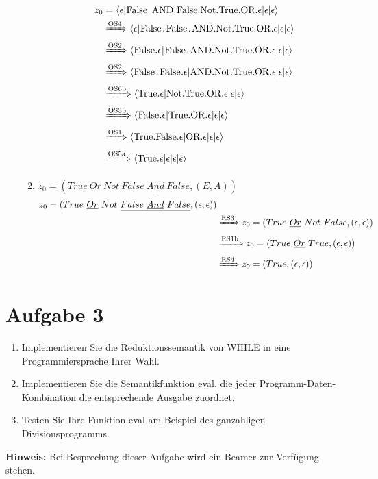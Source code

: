 \documentclass[ngerman,a4paper]{report}
\begin{document}
\begin{enumerate}
\begin{enumerate}
\begin{align*}
z_0&=\langle \epsilon|\text{\lstinline!False AND False.Not.True.OR!}.\epsilon|\epsilon|\epsilon\rangle \\
&\xRightarrow{\text{OS4}} \langle \epsilon|\text{\lstinline!False.False.AND.Not.True.OR!}.\epsilon|\epsilon|\epsilon\rangle\\
&\xRightarrow{\text{OS2}} \langle \text{\lstinline!False!}.\epsilon|\text{\lstinline!False.AND.Not.True.OR!}.\epsilon|\epsilon|\epsilon\rangle\\
&\xRightarrow{\text{OS2}} \langle \text{\lstinline!False.False!}.\epsilon|\text{\lstinline!AND.Not.True.OR!}.\epsilon|\epsilon|\epsilon\rangle\\
&\xRightarrow{\text{OS6b}} \langle \text{\lstinline!True!}.\epsilon|\text{\lstinline!Not.True.OR!}.\epsilon|\epsilon|\epsilon\rangle\\
&\xRightarrow{\text{OS3b}} \langle \text{\lstinline!False!}.\epsilon|\text{\lstinline!True.OR!}.\epsilon|\epsilon|\epsilon\rangle\\
&\xRightarrow{\text{OS1}} \langle \text{\lstinline!True.False!}.\epsilon|\text{\lstinline!OR!}.\epsilon|\epsilon|\epsilon\rangle\\
&\xRightarrow{\text{OS5a}} \langle \text{\lstinline!True!}.\epsilon|\epsilon|\epsilon|\epsilon\rangle\\
\end{align*}
\item $z_0=(True\ \underline{Or}\ Not\ \underline{False\ \underline{And}\ False}, (E,A))$\\
\begin{align*}
z_0=(True\ \underline{Or}\ Not\ \underline{False\ \underline{And}\ False}, (\epsilon,\epsilon))\\
&\xRightarrow{\text{RS3}} z_0=(True\ \underline{Or}\ Not\ False, (\epsilon,\epsilon))\\
&\xRightarrow{\text{RS1b}} z_0=(True\ \underline{Or}\ True, (\epsilon,\epsilon))\\
&\xRightarrow{\text{RS4}} z_0=(True,(\epsilon,\epsilon))
\end{align*}
\end{enumerate}
\end{enumerate}
\section*{Aufgabe 3 }
\begin{enumerate}
	\item Implementieren Sie die Reduktionssemantik von WHILE in eine Programmiersprache Ihrer Wahl.
	\item Implementieren Sie die Semantikfunktion eval, die jeder Programm-Daten-Kombination die entsprechende Ausgabe zuordnet.
	\item Testen Sie Ihre Funktion eval am Beispiel des ganzahligen Divisionsprogramms.
\end{enumerate}
\textbf{Hinweis:} Bei Besprechung dieser Aufgabe wird ein Beamer zur Verfügung stehen.
\end{document}
